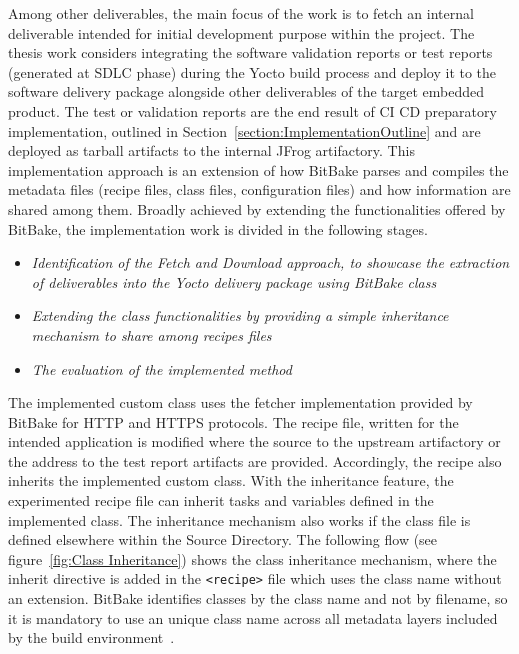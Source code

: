 Among other deliverables, the main focus of the work is to fetch an internal deliverable intended for initial development purpose within the project. The thesis work considers integrating the software validation reports or test reports (generated at \ac{SDLC} phase) during the Yocto build process and deploy it to the software delivery package alongside other deliverables of the target embedded product. The test or validation reports are the end result of \ac{CI} \ac{CD} preparatory implementation, outlined in Section~\ref{section:ImplementationOutline} and are deployed as tarball artifacts to the internal JFrog artifactory. This implementation approach is an extension of how BitBake parses and compiles the metadata files (recipe files, class files, configuration files) and how information are shared among them. Broadly achieved by extending the functionalities offered by BitBake, the implementation work is divided in the following stages.

\vspace{0.2cm}
\begin{itemize}
\item \emph{Identification of the Fetch and Download approach, to showcase the extraction of deliverables into the Yocto delivery package using BitBake class}
\item \emph{Extending the class functionalities by providing a simple inheritance mechanism to share among recipes files}
\item \emph{The evaluation of the implemented method}

\end{itemize}
\vspace{0.2cm}

The implemented custom class uses the fetcher implementation provided by BitBake for \ac{HTTP} and \ac{HTTPS} protocols. The recipe file, written for the intended application is modified where the source to the upstream artifactory or the address to the test report artifacts are provided. Accordingly, the recipe also inherits the implemented custom class. With the inheritance feature, the experimented recipe file can inherit tasks and variables defined in the implemented class. The inheritance mechanism also works if the class file is defined elsewhere within the Source Directory. The following flow (see figure~\ref{fig:Class Inheritance}) shows the class inheritance mechanism, where the inherit directive is added in the \texttt{<recipe>} file which uses the class name without an extension. BitBake identifies classes by the class name and not by filename, so it is mandatory to use an unique class name across all metadata layers included by the build environment~\parencite{Reference1}.

